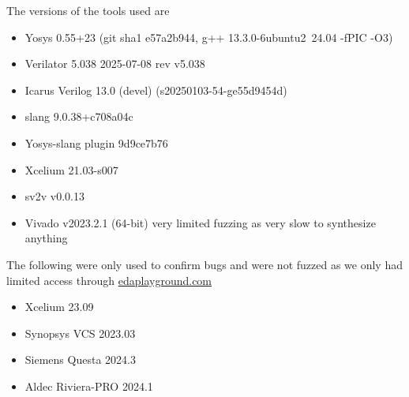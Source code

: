 The versions of the tools used are
\begin{itemize}
    \item Yosys 0.55+23 (git sha1 e57a2b944, g++ 13.3.0-6ubuntu2~24.04 -fPIC -O3)
    \item Verilator 5.038 2025-07-08 rev v5.038
    \item Icarus Verilog 13.0 (devel) (s20250103-54-ge55d9454d)
    \item slang 9.0.38+c708a04c
    \item Yosys-slang plugin 9d9ce7b76
    \item Xcelium 21.03-s007
    \item sv2v v0.0.13
    \item Vivado v2023.2.1 (64-bit) very limited fuzzing as very slow to synthesize anything
\end{itemize}

The following were only used to confirm bugs and were not fuzzed as we only had limited access through \url{edaplayground.com}
\begin{itemize}
    \item Xcelium 23.09
    \item Synopsys VCS 2023.03
    \item Siemens Questa 2024.3
    \item Aldec Riviera-PRO 2024.1
\end{itemize}